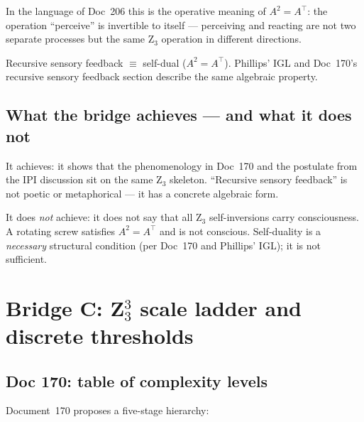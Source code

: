 In the language of Doc~206 this is the operative meaning of $A^2 = A^\top$: the operation ``perceive'' is invertible to itself --- perceiving and reacting are not two separate processes but the same Z$_3$ operation in different directions.

\begin{insightBox}
Recursive sensory feedback $\equiv$ self-dual ($A^2 = A^\top$). Phillips' IGL and Doc~170's recursive sensory feedback section describe the same algebraic property.
\end{insightBox}

\subsection{What the bridge achieves --- and what it does not}

It achieves: it shows that the phenomenology in Doc~170 and the postulate from the IPI discussion sit on the same Z$_3$ skeleton. ``Recursive sensory feedback'' is not poetic or metaphorical --- it has a concrete algebraic form.

It does \emph{not} achieve: it does not say that all Z$_3$ self-inversions carry consciousness. A rotating screw satisfies $A^2 = A^\top$ and is not conscious. Self-duality is a \emph{necessary} structural condition (per Doc~170 and Phillips' IGL); it is not sufficient.

\section{\texorpdfstring{Bridge C: Z$_3^3$ scale ladder and discrete thresholds}{Bridge C: Z3-cubed scale ladder and discrete thresholds}}\label{sec:bridgeC}

\subsection{Doc 170: table of complexity levels}

Document~170 proposes a five-stage hierarchy:

\begin{center}
\end{center}

